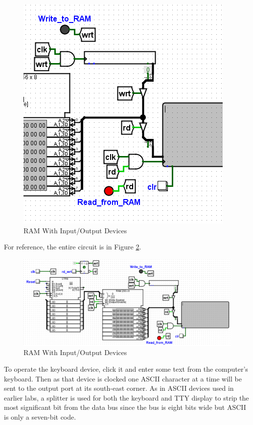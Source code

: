 \begin{figure}[H]
	\centering
	\includegraphics[width=\maxwidth{.95\linewidth}]{gfx/10-04}
	\caption{RAM With Input/Output Devices}
	\label{fig:10-04}
\end{figure}

For reference, the entire circuit is in Figure \ref{fig:10-05}.

\begin{figure}[H]
	\centering
	\includegraphics[width=\maxwidth{.95\linewidth}]{gfx/10-05}
	\caption{RAM With Input/Output Devices}
	\label{fig:10-05}
\end{figure}

To operate the keyboard device, click it and enter some text from the computer's keyboard. Then as that device is clocked one ASCII character at a time will be sent to the output port at its south-east corner. As in ASCII devices used in earlier labs, a splitter is used for both the keyboard and TTY display to strip the most significant bit from the data bus since the bus is eight bits wide but ASCII is only a seven-bit code.

